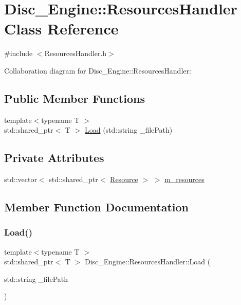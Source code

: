 \hypertarget{class_disc___engine_1_1_resources_handler}{}\section{Disc\+\_\+\+Engine\+:\+:Resources\+Handler Class Reference}
\label{class_disc___engine_1_1_resources_handler}


{\ttfamily \#include $<$Resources\+Handler.\+h$>$}



Collaboration diagram for Disc\+\_\+\+Engine\+:\+:Resources\+Handler\+:
\subsection*{Public Member Functions}
\begin{DoxyCompactItemize}
\item 
{\footnotesize template$<$typename T $>$ }\\std\+::shared\+\_\+ptr$<$ T $>$ \mbox{\hyperlink{class_disc___engine_1_1_resources_handler_a395cebe15295d842e24a0e209dde6849}{Load}} (std\+::string \+\_\+file\+Path)
\end{DoxyCompactItemize}
\subsection*{Private Attributes}
\begin{DoxyCompactItemize}
\item 
std\+::vector$<$ std\+::shared\+\_\+ptr$<$ \mbox{\hyperlink{class_disc___engine_1_1_resource}{Resource}} $>$ $>$ \mbox{\hyperlink{class_disc___engine_1_1_resources_handler_a097a16434ff1b7ef490f08e18ef10c84}{m\+\_\+resources}}
\end{DoxyCompactItemize}


\subsection{Member Function Documentation}
\mbox{\label{class_disc___engine_1_1_resources_handler_a395cebe15295d842e24a0e209dde6849}} 
\subsubsection{\texorpdfstring{Load()}{Load()}}
{\footnotesize\ttfamily template$<$typename T $>$ \\
std\+::shared\+\_\+ptr$<$ T $>$ Disc\+\_\+\+Engine\+::\+Resources\+Handler\+::\+Load (\begin{DoxyParamCaption}\item[{std\+::string}]{\+\_\+file\+Path }\end{DoxyParamCaption})\hspace{0.3cm}{\ttfamily [inline]}}



